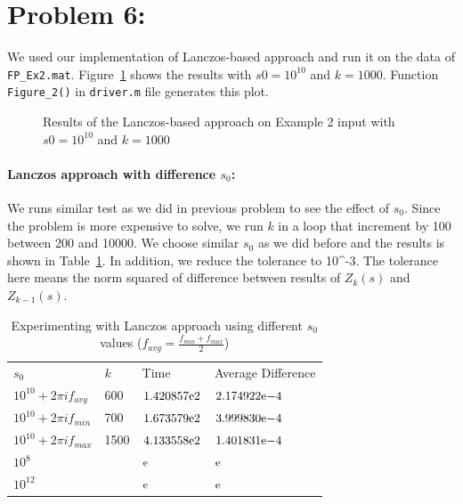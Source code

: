 \section*{Problem 6:}
We used our implementation of Lanczos-based approach and run it on the data of \texttt{FP\_Ex2.mat}. Figure~\ref{fig:fig2} shows the results with $s0 = 10^{10}$ and $k = 1000$.  Function \texttt{Figure\_2()} in \texttt{driver.m} file generates this plot. 

\begin{figure}[!tbh]
\centering        
   \caption{Results of the Lanczos-based approach on Example 2 input with $s0 = 10^{10}$ and $k = 1000$ }
   \label{fig:fig2}
\end{figure}

\paragraph{Lanczos approach with difference $s_{0}$:}  We runs similar test as we did in previous problem to see the effect of $s_{0}$. Since the problem is more expensive to solve, we run $k$ in a loop that increment by 100 between 200 and 10000. We choose similar $s_{0}$ as we did before and the results is shown in Table~\ref{tab:s02}. In addition, we reduce the tolerance to 10^{-3}. The tolerance here means the norm squared of difference between results of $Z_{k}(s)$ and $Z_{k-1}(s)$. 


\begin{table}[!tbh]
 \centering    
\begin{tabular}{ ||p{3.0cm}|p{1.5cm}| p{4cm}| p{4cm}||}
\hline
 $s_{0}$  & $k$ & Time & Average Difference \\ \hhline{|=|=|=|=|} 
 $10^{10} + 2 \pi i f_{avg}$ & 600 & ${1.420857}\mathrm{e}{2}$ & ${2.174922}\mathrm{e}{-4}$ \\
 $10^{10} + 2 \pi i f_{min}$ & 700 & ${1.673579}\mathrm{e}{2}$ & ${3.999830}\mathrm{e}{-4}$ \\
 $10^{10} + 2 \pi i f_{max}$ & 1500& ${4.133558}\mathrm{e}{2}$& ${1.401831}\mathrm{e}{-4}$\\
 $10^{8} $                   &     & ${}\mathrm{e}{}$& ${}\mathrm{e}{}$ \\
 $10^{12}$                   &     & ${}\mathrm{e}{}$& ${}\mathrm{e}{}$\\  
\hline
\end{tabular} 
\caption{Experimenting with Lanczos approach using different $s_{0}$ values ($f_{avg} = \frac{f_{min}+f_{max}}{2}$) }
   \label{tab:s02}
\end{table}